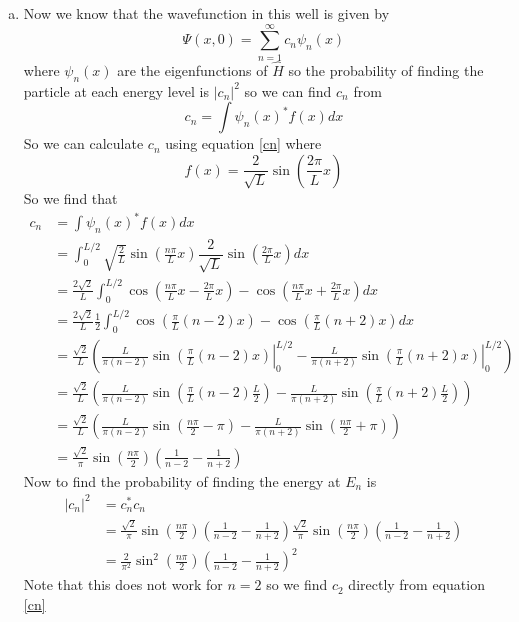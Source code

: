 \documentclass[11pt]{article}
\numberwithin{equation}{section}
\begin{document}
\begin{enumerate}[(a)]
\item
Now we know that the wavefunction in this well is given by
$$\Psi(x,0) = \sum_{n=1}^{\infty}c_n\psi_n(x)$$
where $\psi_n(x)$ are the eigenfunctions of $\hat{H}$ so the probability of finding the particle at each energy level is $|c_n|^2$ so we can find $c_n$ from
\begin{equation}
c_n = \int\psi_n(x)^*f(x)dx
\label{cn}
\end{equation}
So we can calculate $c_n$ using equation \ref{cn} where 
$$f(x) = \dfrac{2}{\sqrt{L}}\sin\left(\frac{2\pi}{L}x\right)$$
So we find that
\begin{align*}
c_n &= \int\psi_n(x)^*f(x)dx\\
&= \int_{0}^{L/2}\sqrt{\frac{2}{L}}\sin\left(\frac{n\pi}{L}x\right)\dfrac{2}{\sqrt{L}}\sin\left(\frac{2\pi}{L}x\right)dx\\
&= \frac{2\sqrt{2}}{L}\int_{0}^{L/2}\cos\left(\frac{n\pi}{L}x-\frac{2\pi}{L}x\right)-\cos\left(\frac{n\pi}{L}x+\frac{2\pi}{L}x\right)dx\\
&= \frac{2\sqrt{2}}{L}\frac{1}{2}\int_{0}^{L/2}\cos\left(\frac{\pi}{L}(n-2)x\right)-\cos\left(\frac{\pi}{L}(n+2)x\right)dx\\
&= \frac{\sqrt{2}}{L}\left(\left.\frac{L}{\pi(n-2)}\sin\left(\frac{\pi}{L}(n-2)x\right)\right|_{0}^{L/2}-\left.\frac{L}{\pi(n+2)}\sin\left(\frac{\pi}{L}(n+2)x\right)\right|_{0}^{L/2}\right)\\
&= \frac{\sqrt{2}}{L}\left(\frac{L}{\pi(n-2)}\sin\left(\frac{\pi}{L}(n-2)\frac{L}{2}\right)-\frac{L}{\pi(n+2)}\sin\left(\frac{\pi}{L}(n+2)\frac{L}{2}\right)\right)\\
&= \frac{\sqrt{2}}{L}\left(\frac{L}{\pi(n-2)}\sin\left(\frac{n\pi}{2} - \pi\right)-\frac{L}{\pi(n+2)}\sin\left(\frac{n\pi}{2} + \pi\right)\right)\\
&= \frac{\sqrt{2}}{\pi}\sin\left(\frac{n\pi}{2}\right)\left(\frac{1}{n-2}-\frac{1}{n+2}\right)
\end{align*}
Now to find the probability of finding the energy at $E_n$ is 
\begin{align*}
|c_n|^2 &= c_n^*c_n\\
&= \frac{\sqrt{2}}{\pi}\sin\left(\frac{n\pi}{2}\right)\left(\frac{1}{n-2}-\frac{1}{n+2}\right)\frac{\sqrt{2}}{\pi}\sin\left(\frac{n\pi}{2}\right)\left(\frac{1}{n-2}-\frac{1}{n+2}\right)\\
&= \frac{2}{\pi^2}\sin^2\left(\frac{n\pi}{2}\right)\left(\frac{1}{n-2}-\frac{1}{n+2}\right)^2
\end{align*}
Note that this does not work for $n=2$ so we find $c_2$ directly from equation \ref{cn}

\end{enumerate}
\end{document}
